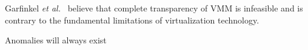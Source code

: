 Garfinkel {\em et al.}~\cite{garfinkel2007} believe that complete
transparency of VMM is infeasible and is contrary to the fundamental limitations
of virtualization technology.

Anomalies will always exist 

